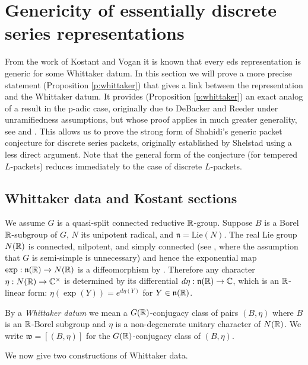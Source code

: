 \documentclass{article}
\theoremstyle{definition}
\numberwithin{equation}{section}
\renewcommand{\-}{\hyp{}}
\newcommand{\n}{\mathfrak n}
\newcommand{\w}{\mathfrak w}
\begin{document}
\section{Genericity of essentially discrete series representations} \label{sec:gen}

From the work of Kostant \cite{Kos78} and Vogan \cite{Vog78} it is known that every eds representation is generic for some Whittaker datum. In this section we will prove a more precise statement (Proposition \ref{p:whittaker}) that gives a link between the representation and the Whittaker datum. It provides  (Proposition \ref{p:whittaker}) an exact analog of a result in the p-adic case, originally due to DeBacker  and Reeder \cite[Proposition 4.10]{DR10} under unramifiedness assumptions, but whose proof applies in much greater generality, see \cite[Lemma 6.2.2]{KalRSP} and \cite[\S4.4]{FKS}. This allows us to prove the strong form of Shahidi's generic packet conjecture \cite[\S9]{Sha90} for discrete series packets, originally established by Shelstad \cite{SheTE3} using a less direct argument. Note that the general form of the conjecture (for tempered $L$\-packets) reduces immediately to the case of discrete $L$\-packets.

\subsection{Whittaker data and Kostant sections} \label{sub:whit}

We assume  $G$ is a quasi-split connected reductive
$\mathbb{R}$-group. Suppose $B$ is a Borel $\mathbb{R}$-subgroup of $G$, $N$ its
unipotent radical, and $\n=\mathrm{Lie}(N)$.
The real Lie group $N(\mathbb{R})$ is connected, nilpotent,
and simply connected (see \cite[Theorem 6.46]{KnappLie}, where the
assumption that $G$ is semi-simple is unnecessary) and hence the
exponential map $\exp : \n(\R) \to N(\R)$ is a diffeomorphism by
\cite[Theorem 1.127]{KnappLie}.
Therefore any character $\eta : N(\mathbb{R}) \to \mathbb{C}^\times$ is
determined by its differential $d\eta : \n(\R) \to \C$, which is an
$\mathbb{R}$-linear form: $\eta(\exp(Y))=e^{d\eta (Y)}$ for $Y \in
\n(\R)$. 

By a  {\it Whittaker datum} we mean a $G(\mathbb{R})$-conjugacy class of  pairs  $(B,\eta)$ where $B$ is an $\mathbb{R}$-Borel subgroup
and $\eta$ is a non-degenerate unitary character of $N(\mathbb{R})$. We  write $\w=[(B,\eta)]$ for the $G(\mathbb{R})$-conjugacy class of $(B,\eta)$. 

We  now give two constructions of Whittaker data.
\end{document}

